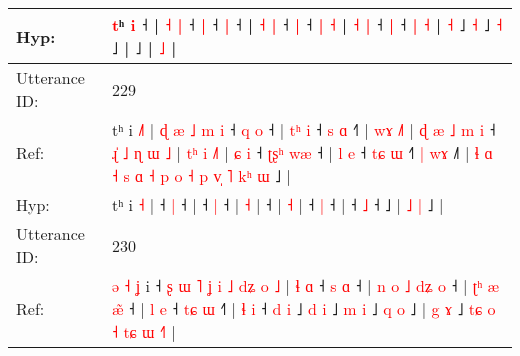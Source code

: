 \documentclass[10pt]{article}
\DeclareRobustCommand{\hl}[1]{{\textcolor{red}{#1}}}
\begin{document}
\begin{longtable}{ll}
 \\
Hyp: & \hl{}\hl{}\hl{}\hl{}\hl{}\hl{}\hl{}\hl{}\hl{}\hl{}\hl{}\hl{}\hl{}\hl{t}ʰ \hl{i} ˧ | \hl{˧} \hl{|} ˧ \hl{}\hl{|} ˧\hl{}\hl{} \hl{|} ˧\hl{} | \hl{˧} \hl{|} ˧\hl{}\hl{} \hl{}\hl{|} ˧\hl{}\hl{} \hl{}\hl{|} \hl{˧} | \hl{˧} \hl{|} ˧\hl{}\hl{} \hl{}\hl{|} ˧\hl{}\hl{} \hl{|} \hl{˧} |\hl{}\hl{} \hl{˧} ˩\hl{}\hl{} \hl{}\hl{˧} ˩\hl{}\hl{}\hl{}\hl{}\hl{}\hl{}\hl{}\hl{}\hl{}\hl{}\hl{}\hl{} \hl{˧} ˩ |\hl{}\hl{}\hl{}\hl{}\hl{} ˩\hl{} |\hl{}\hl{}\hl{}\hl{}\hl{}\hl{}\hl{}\hl{}\hl{}\hl{}\hl{}\hl{}\hl{}\hl{}\hl{}\hl{}\hl{} \hl{˩} |
 \\
\midrule
Utterance ID: & 229 \\
Ref: & tʰ i \hl{˩}\hl{˥} |\hl{ }\hl{ɖ}\hl{ }\hl{æ}\hl{ }\hl{˩}\hl{ }\hl{m}\hl{ }\hl{i} ˧\hl{ }\hl{q} \hl{o} ˧ |\hl{ }\hl{t}\hl{ʰ}\hl{ }\hl{i} ˧\hl{ }\hl{s} \hl{ɑ} ˧\hl{˥} |\hl{ }\hl{w}\hl{ɤ} \hl{˩}\hl{˥} |\hl{ }\hl{ɖ}\hl{ }\hl{æ}\hl{ }\hl{˩}\hl{ }\hl{m}\hl{ }\hl{i} ˧\hl{ }\hl{ɻ}\hl{̍}\hl{ }\hl{˩}\hl{ }\hl{ɳ}\hl{ }\hl{ɯ}\hl{ }\hl{˩} |\hl{ }\hl{t}\hl{ʰ}\hl{ }\hl{i} \hl{˩}\hl{˥} |\hl{ }\hl{ɕ}\hl{ }\hl{i} ˧\hl{ }\hl{ʈ}\hl{ʂ}\hl{ʰ} \hl{w}\hl{æ} ˧ |\hl{ }\hl{l}\hl{ }\hl{e} ˧\hl{ }\hl{t}\hl{ɕ} \hl{ɯ} ˧\hl{˥}\hl{ }\hl{|}\hl{ }\hl{w}\hl{ɤ} ˩\hl{˥} |\hl{ }\hl{ɬ}\hl{ }\hl{ɑ}\hl{ }\hl{˧}\hl{ }\hl{s}\hl{ }\hl{ɑ}\hl{ }\hl{˧}\hl{ }\hl{p}\hl{ }\hl{o}\hl{ }\hl{˧}\hl{ }\hl{p}\hl{ }\hl{v}\hl{̩}\hl{ }\hl{˥} \hl{k}\hl{ʰ} \hl{ɯ} ˩ |
 \\
Hyp: & tʰ i \hl{}\hl{˧} |\hl{}\hl{}\hl{}\hl{}\hl{}\hl{}\hl{}\hl{}\hl{}\hl{} ˧\hl{}\hl{} \hl{|} ˧ |\hl{}\hl{}\hl{}\hl{}\hl{} ˧\hl{}\hl{} \hl{|} ˧\hl{} |\hl{}\hl{}\hl{} \hl{}\hl{˧} |\hl{}\hl{}\hl{}\hl{}\hl{}\hl{}\hl{}\hl{}\hl{}\hl{} ˧\hl{}\hl{}\hl{}\hl{}\hl{}\hl{}\hl{}\hl{}\hl{}\hl{}\hl{} |\hl{}\hl{}\hl{}\hl{}\hl{} \hl{}\hl{˧} |\hl{}\hl{}\hl{}\hl{} ˧\hl{}\hl{}\hl{}\hl{} \hl{}\hl{|} ˧ |\hl{}\hl{}\hl{}\hl{} ˧\hl{}\hl{}\hl{} \hl{˩} ˧\hl{}\hl{}\hl{}\hl{}\hl{}\hl{} ˩\hl{} |\hl{}\hl{}\hl{}\hl{}\hl{}\hl{}\hl{}\hl{}\hl{}\hl{}\hl{}\hl{}\hl{}\hl{}\hl{}\hl{}\hl{}\hl{}\hl{}\hl{}\hl{}\hl{}\hl{}\hl{}\hl{} \hl{}\hl{˩} \hl{|} ˩ |
 \\
\midrule
Utterance ID: & 230 \\
Ref: & \hl{ə}\hl{ }\hl{˧}\hl{ }\hl{ʝ} i ˧\hl{ }\hl{ʂ}\hl{ }\hl{ɯ}\hl{ }\hl{˥}\hl{ }\hl{ʝ}\hl{ }\hl{i}\hl{ }\hl{˩}\hl{ }\hl{d}\hl{ʑ}\hl{ }\hl{o}\hl{ }\hl{˩} |\hl{ }\hl{ɬ}\hl{ }\hl{ɑ} ˧\hl{ }\hl{s} \hl{ɑ} ˧ |\hl{ }\hl{n}\hl{ }\hl{o}\hl{ }\hl{˩}\hl{ }\hl{d}\hl{ʑ}\hl{ }\hl{o} ˧ |\hl{ }\hl{ʈ}\hl{ʰ}\hl{ }\hl{æ}\hl{ }\hl{æ}\hl{̃} ˧ |\hl{ }\hl{l}\hl{ }\hl{e} ˧\hl{ }\hl{t}\hl{ɕ} \hl{ɯ} ˧\hl{˥} | \hl{ɬ} \hl{i} ˧ \hl{d} \hl{i} ˩\hl{ }\hl{d} \hl{i} ˩\hl{ }\hl{m} \hl{i} ˩\hl{ }\hl{q} \hl{o} ˩ |\hl{ }\hl{g}\hl{ }\hl{ɤ} ˩\hl{ }\hl{t}\hl{ɕ}\hl{ }\hl{o}\hl{ }\hl{˧}\hl{ }\hl{t}\hl{ɕ}\hl{ }\hl{ɯ}\hl{ }\hl{˧}\hl{˥} |

\end{longtable}
\end{document}
